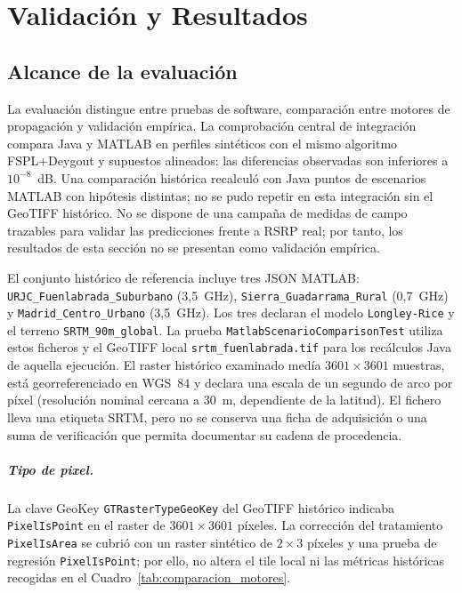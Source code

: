 \chapter{Validación y Resultados}
\label{cap:capitulo5}

\section{Alcance de la evaluación}
\label{sec:escenario}

La evaluación distingue entre pruebas de software, comparación entre motores de
propagación y validación empírica. La comprobación central de integración compara
Java y MATLAB en perfiles sintéticos con el mismo algoritmo FSPL+Deygout y supuestos
alineados: las diferencias observadas son inferiores a $10^{-8}$~dB. Una comparación
histórica recalculó con Java puntos de escenarios MATLAB con hipótesis distintas; no
se pudo repetir en esta integración sin el GeoTIFF histórico. No se dispone de una campaña de medidas de
campo trazables para validar las predicciones frente a RSRP real; por tanto, los resultados
de esta sección no se presentan como validación empírica.

El conjunto histórico de referencia incluye tres JSON MATLAB: \texttt{URJC\_Fuenlabrada\_Suburbano}
(3,5~GHz), \texttt{Sierra\_Guadarrama\_Rural} (0,7~GHz) y
\texttt{Madrid\_Centro\_Urbano} (3,5~GHz). Los tres declaran el modelo
\texttt{Longley-Rice} y el terreno \texttt{SRTM\_90m\_global}. La prueba
\texttt{MatlabScenarioComparisonTest} utiliza estos ficheros y el GeoTIFF local
\texttt{srtm\_fuenlabrada.tif} para los recálculos Java de aquella ejecución. El raster
histórico examinado medía
$3601\times3601$ muestras, está georreferenciado en WGS~84 y declara una escala de un
segundo de arco por píxel (resolución nominal cercana a 30~m, dependiente de la latitud).
El fichero lleva una etiqueta SRTM, pero no se conserva una ficha de adquisición o una
suma de verificación que permita documentar su cadena de procedencia.

\paragraph{Tipo de pixel.}
La clave GeoKey \texttt{GTRasterTypeGeoKey} del GeoTIFF histórico indicaba
\texttt{PixelIsPoint} en el raster de $3601\times3601$ píxeles. La corrección del
tratamiento \texttt{PixelIsArea} se cubrió con un raster sintético de $2\times3$ píxeles
y una prueba de regresión \texttt{PixelIsPoint}; por ello, no altera el tile local ni las
métricas históricas recogidas en el Cuadro~\ref{tab:comparacion_motores}.

